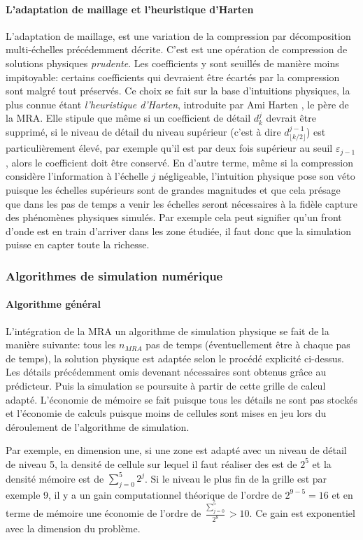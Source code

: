     \paragraph{L'adaptation de maillage et l'heuristique d'Harten}
            L'adaptation de maillage, est une variation de la compression par décomposition multi-échelles précédemment décrite. 
            C'est est une opération de compression de solutions physiques \textit{prudente}.
            Les coefficients y sont seuillés de manière moins impitoyable: certains coefficients qui devraient être écartés
            par la compression sont malgré tout préservés. Ce choix se fait sur la base d'intuitions physiques, 
            la plus connue étant \textit{l'heuristique d'Harten}, introduite par Ami Harten \cite{harten1994}, le père de la MRA.
            Elle stipule que même si un coefficient de détail $d_k^j$ devrait être supprimé, si le niveau de détail du niveau supérieur 
            (c'est à dire $d^{j-1}_{\lfloor k/2 \rfloor}$) est particulièrement élevé, par exemple qu'il est par deux fois supérieur au seuil $\varepsilon_{j-1}$,
            alors le coefficient doit être conservé. En d'autre terme, même si la compression considère l'information à l'échelle $j$ négligeable,
            l'intuition physique pose son véto puisque les échelles supérieurs sont de grandes magnitudes et que cela présage que dans 
            les pas de temps a venir les échelles seront nécessaires à la fidèle capture des phénomènes physiques simulés. Par exemple cela peut signifier qu'un front
            d'onde est en train d'arriver dans les zone étudiée, il faut donc que la simulation puisse en capter toute la richesse.
\subsubsection{Algorithmes de simulation numérique}
    \paragraph{Algorithme général}
            L'intégration de la MRA un algorithme de simulation physique se fait de la manière suivante: 
            tous les $n_{MRA}$ pas de temps (éventuellement être à chaque pas de temps), 
            la solution physique est adaptée selon le procédé explicité ci-dessus. Les détails précédemment omis
            devenant nécessaires sont obtenus grâce au prédicteur. Puis la simulation se poursuite à partir de cette grille de calcul adapté.
            L'économie de mémoire se fait puisque tous les détails ne sont pas stockés et l'économie de calculs puisque moins de cellules sont mises en 
            jeu lors du déroulement de l’algorithme de simulation.\par
            Par exemple, en dimension une, si une zone est adapté avec un niveau de détail de niveau 5, la densité de cellule sur lequel il faut réaliser des est de $2^5$
            et la densité mémoire est de $\sum_{j=0}^5 2^j$. Si le niveau le plus fin de la grille est par exemple 9, il y a un gain computationnel théorique de l'ordre de 
            $2^{9-5}=16$ et en terme de mémoire une économie de l'ordre de $\frac{\sum_{j=0}^5}{2^8} > 10$. Ce gain est exponentiel avec la dimension du problème.
